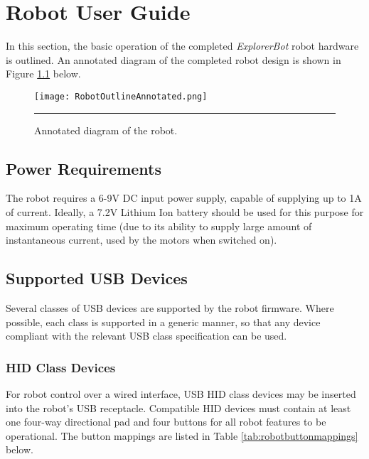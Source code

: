 \chapter{Robot User Guide}
\label{app:robotuserguide}

In this section, the basic operation of the completed \textit{ExplorerBot} robot hardware is outlined. An annotated diagram of the completed robot design is shown in Figure \ref{fig:robotoutlineannotated} below.

\begin{figure}[H]
	\centering
		\texttt{[image: RobotOutlineAnnotated.png]}
	\rule{35em}{0.5pt}
	\caption[Annotated diagram of the robot]{Annotated diagram of the robot.}
	\label{fig:robotoutlineannotated}
\end{figure}

\section{Power Requirements}

The robot requires a 6-9V DC input power supply, capable of supplying up to 1A of current. Ideally, a 7.2V Lithium Ion battery should be used for this purpose for maximum operating time (due to its ability to supply large amount of instantaneous current, used by the motors when switched on).

\section{Supported USB Devices}

Several classes of USB devices are supported by the robot firmware. Where possible, each class is supported in a generic manner, so that any device compliant with the relevant USB class specification can be used.

\subsection{HID Class Devices}

For robot control over a wired interface, USB HID class devices may be inserted into the robot's USB receptacle. Compatible HID devices must contain at least one four-way directional pad and four buttons for all robot features to be operational. The button mappings are listed in Table \ref{tab:robotbuttonmappings} below.

